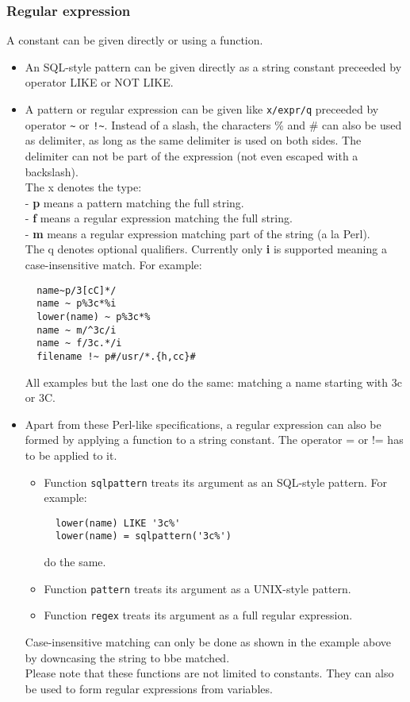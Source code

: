 \subsubsection{\label{TAQL:REGEXCONST}Regular expression}
A  constant can be given
directly or using a function.
\begin{itemize}
\item An SQL-style pattern can be given directly as a string constant
  preceeded by operator LIKE or NOT LIKE.
\item A pattern or regular expression can be given like
  \texttt{x/expr/q} preceeded by operator \verb+~+ or \verb+!~+.
  Instead of a slash, the characters \% and \# can also be used as
  delimiter, as long as the same delimiter is used on both sides.
  The delimiter can not be part of the expression 
  (not even escaped with a backslash).
  \\The x denotes the type:
  \\- \textbf{p} means a pattern matching the full string.
  \\- \textbf{f} means a regular expression matching the full string.
  \\- \textbf{m} means a regular expression matching part of the string (a la Perl).
  \\The q denotes optional qualifiers. Currently only \textbf{i} is supported
  meaning a case-insensitive match. For example:
\begin{verbatim}
  name~p/3[cC]*/
  name ~ p%3c*%i
  lower(name) ~ p%3c*%
  name ~ m/^3c/i
  name ~ f/3c.*/i
  filename !~ p#/usr/*.{h,cc}#
\end{verbatim}
  All examples but the last one do the same: matching a name starting with
  3c or 3C.
  \item Apart from these Perl-like specifications, a regular expression can
  also be formed by applying a function to a string constant. The operator
  = or != has to be applied to it.
  \begin{itemize}
  \item Function \texttt{sqlpattern} treats its argument as an SQL-style pattern.
    For example:
\begin{verbatim}
  lower(name) LIKE '3c%'
  lower(name) = sqlpattern('3c%')
\end{verbatim}
    do the same.
  \item Function \texttt{pattern} treats its argument as a UNIX-style pattern.
  \item Function \texttt{regex} treats its argument as a full regular expression.
  \end{itemize}
  Case-insensitive matching can only be done as shown in the example
  above by downcasing the string to bbe matched.
  \\Please note that these functions are not limited to constants. They can
  also be used to form regular expressions from variables.


\end{itemize}
